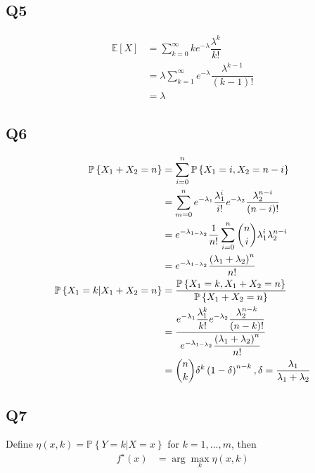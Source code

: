 \documentclass{article}
\begin{document}
\subsection{Q5}
\begin{align*}
\mathbb{E}\left[X\right] &= \displaystyle\sum_{k=0}^{\infty} k e^{-\lambda} \dfrac{\lambda^{k}}{k!}
\\ &= \lambda \displaystyle\sum_{k=1}^{\infty} e^{-\lambda} \dfrac{\lambda^{k-1}}{\left(k-1\right)!}
\\ &= \lambda
\end{align*}


\subsection{Q6}
\begin{align*}
\mathbb{P}\left\{X_{1} + X_{2} = n\right\} &= \displaystyle\sum_{i=0}^{n} \mathbb{P}\left\{X_{1} = i, X_{2} = n - i\right\}
\\ &= \displaystyle\sum_{m=0}^{n} e^{-\lambda_{1}} \dfrac{\lambda_{1}^{i}}{i!} e^{-\lambda_{2}} \dfrac{\lambda_{2}^{n-i}}{\left(n - i\right)!}
\\ &= e^{-\lambda_{1-\lambda_{2}}} \dfrac{1}{n!} \displaystyle\sum_{i=0}^{n} \dbinom{n}{i} \lambda_{1}^{i} \lambda_{2}^{n-i}
\\ &= e^{-\lambda_{1-\lambda_{2}}} \dfrac{\left(\lambda_{1} + \lambda_{2}\right)^{n}}{n!}
\\ \mathbb{P}\left\{X_{1} = k | X_{1} + X_{2} = n\right\} &= \dfrac{\mathbb{P}\left\{X_{1} = k, X_{1} + X_{2} = n\right\}}{\mathbb{P}\left\{X_{1} + X_{2} = n\right\}}
\\ &= \dfrac{e^{-\lambda_{1}} \dfrac{\lambda_{1}^{k}}{k!} e^{-\lambda_{2}} \dfrac{\lambda_{2}^{n-k}}{\left(n-k\right)!}}{e^{-\lambda_{1-\lambda_{2}}} \dfrac{\left(\lambda_{1} + \lambda_{2}\right)^{n}}{n!}}
\\ &= \dbinom{n}{k} \delta^{k} \left(1 - \delta\right)^{n-k}, \delta = \dfrac{\lambda_{1}}{\lambda_{1} + \lambda_{2}}
\end{align*}


\subsection{Q7}
Define $\eta\left(x, k \right) = \mathbb{P}\left\{Y = k | X = x \right\}$ for $k  = 1, ..., m $, then
\begin{align*}
f^\star \left(x\right) &= \arg\displaystyle\max_{k} \eta\left(x, k\right)
\end{align*}
\end{document}
